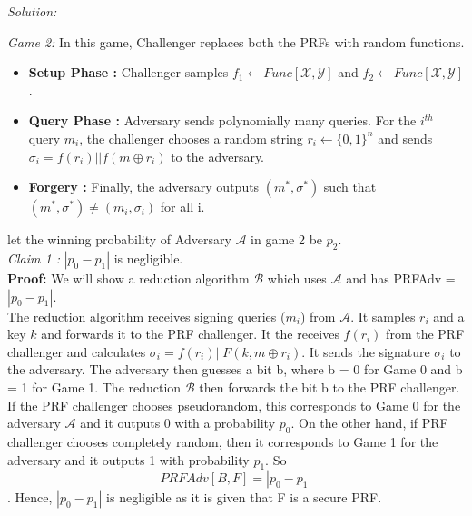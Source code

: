 \documentclass[a4paper, 11pt]{article}
\newenvironment{solution}
    {\textit{Solution:}}
    {\clearpage}
\newcommand{\calA}{\mathcal{A}}
\newcommand{\calB}{\mathcal{B}}
\newcommand{\calX}{\mathcal{X}}
\newcommand{\calY}{\mathcal{Y}}
\begin{document}
\begin{solution}
\begin{enumerate}[(a)]
    \textit{Game 2:} In this game, Challenger replaces both the PRFs with random functions.
    \begin{itemize}
        \item \textbf{Setup Phase :} Challenger samples $f_1 \leftarrow Func[\calX, \calY]$ and $f_2 \leftarrow Func[\calX, \calY]$.
        \item \textbf{Query Phase :} Adversary sends polynomially many queries. For the $i^{th}$ query $m_i$, the challenger chooses a random string $r_i \leftarrow \{0, 1\}^n$ and sends $\sigma_i = f(r_i) || f(m \oplus r_i)$ to the adversary.
        \item \textbf{Forgery :} Finally, the adversary outputs $(m^*, \sigma^*)$ such that $(m^*, \sigma^*) \neq (m_i, \sigma_i)$ for all i.
    \end{itemize}
    let the winning probability of Adversary $\calA$ in game 2 be $p_2$. \\
    
    \textit{Claim 1 :} $|p_0 - p_1|$ is negligible.\\
    \textbf{Proof:} We will show a reduction algorithm $\calB$ which uses $\calA$ and has PRFAdv = $|p_0 - p_1|$.\\
    The reduction algorithm receives signing queries ($m_i$) from $\calA$. It samples $r_i$ and a key $k$ and forwards it to the PRF challenger. It the receives $f(r_i)$ from the PRF challenger and calculates $\sigma_i = f(r_i) || F(k, m \oplus r_i)$. It sends the signature $\sigma_i$ to the adversary. The adversary then guesses a bit b, where b = 0 for Game 0 and b = 1 for Game 1. The reduction $\calB$ then forwards the bit b to the PRF challenger.\\
    If the PRF challenger chooses pseudorandom, this corresponds to Game 0 for the adversary $\calA$ and it outputs 0 with a probability $p_0$. On the other hand, if PRF challenger chooses completely random, then it corresponds to Game 1 for the adversary and it outputs 1 with probability $p_1$. So $$PRFAdv[B, F] = |p_0 - p_1|$$.
    Hence, $|p_0 - p_1|$ is negligible as it is given that F is a secure PRF.\\


\end{enumerate}
\end{solution}
\end{document}
